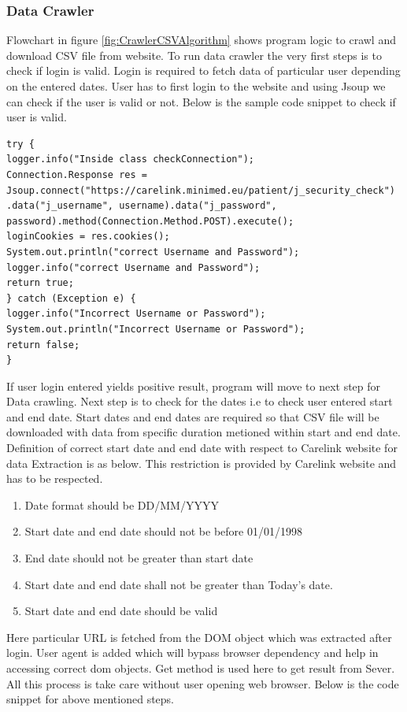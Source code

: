 \documentclass[article,type=msc,colorback,accentcolor=tud9c,twoside,11pt]{tudthesis}
\begin{document}
 
\subsubsection{Data Crawler}
\label{subsec:DataCrawler}
 Flowchart in figure \ref{fig:CrawlerCSVAlgorithm} shows program logic to crawl and download CSV file from website. To run data crawler the very first steps is to check if login is valid. Login is required to fetch data of particular user depending on the entered dates. User has to first login to the website and using Jsoup we can check if the user is valid or not. Below is the sample code snippet to check if user is valid.
\begin{lstlisting}
try {
logger.info("Inside class checkConnection");
Connection.Response res = Jsoup.connect("https://carelink.minimed.eu/patient/j_security_check")
.data("j_username", username).data("j_password", password).method(Connection.Method.POST).execute();
loginCookies = res.cookies();
System.out.println("correct Username and Password");
logger.info("correct Username and Password");
return true;
} catch (Exception e) {
logger.info("Incorrect Username or Password");
System.out.println("Incorrect Username or Password");
return false;
}
\end{lstlisting}
If user login entered yields positive result, program will move to next step for Data crawling. Next step is to check for the dates i.e to check user entered start and end date. Start dates and end dates are required so that CSV file will be downloaded with data from specific duration metioned within start and end date. Definition of correct start date and end date with respect to Carelink website for data Extraction is as below. This restriction is provided by Carelink website and has to be respected.
\begin{enumerate}
\item Date format should be DD/MM/YYYY
\item Start date and end date should not be before 01/01/1998
\item End date should not be greater than start date
\item Start date and end date shall not be greater than Today's date.
\item Start date and end date should be valid
\end{enumerate}
Here particular URL is fetched from the DOM object which was extracted after login. User agent is added which will bypass browser dependency and help in accessing correct dom objects. Get method is used here to get result from Sever. All this process is take care without user opening web browser. Below is the code snippet for above mentioned steps. 
\end{document}
